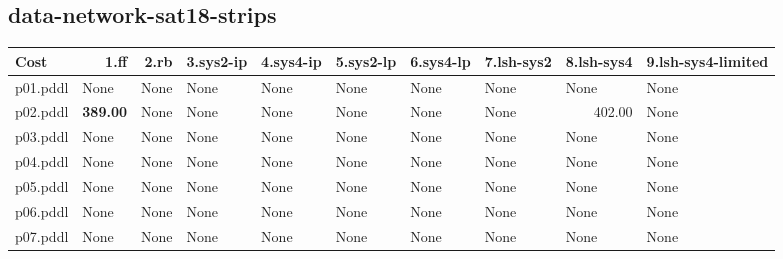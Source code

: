 \documentclass{article}
\begin{document}
\hypertarget{cost-data-network-sat18-strips}{}
\subsection*{data-network-sat18-strips}

\begin{tabular}{@{}lrrrrrrrrr@{}}
Cost & 1.ff & 2.rb & 3.sys2-ip & 4.sys4-ip & 5.sys2-lp & 6.sys4-lp & 7.lsh-sys2 & 8.lsh-sys4 & 9.lsh-sys4-limited \\
\midrule
p01.pddl & \multicolumn{1}{|l|}{None} & \multicolumn{1}{|l|}{None} & \multicolumn{1}{|l|}{None} & \multicolumn{1}{|l|}{None} & \multicolumn{1}{|l|}{None} & \multicolumn{1}{|l|}{None} & \multicolumn{1}{|l|}{None} & \multicolumn{1}{|l|}{None} & \multicolumn{1}{|l|}{None} \\
p02.pddl & \textbf{389.00} & \multicolumn{1}{|l|}{None} & \multicolumn{1}{|l|}{None} & \multicolumn{1}{|l|}{None} & \multicolumn{1}{|l|}{None} & \multicolumn{1}{|l|}{None} & \multicolumn{1}{|l|}{None} & 402.00 & \multicolumn{1}{|l|}{None} \\
p03.pddl & \multicolumn{1}{|l|}{None} & \multicolumn{1}{|l|}{None} & \multicolumn{1}{|l|}{None} & \multicolumn{1}{|l|}{None} & \multicolumn{1}{|l|}{None} & \multicolumn{1}{|l|}{None} & \multicolumn{1}{|l|}{None} & \multicolumn{1}{|l|}{None} & \multicolumn{1}{|l|}{None} \\
p04.pddl & \multicolumn{1}{|l|}{None} & \multicolumn{1}{|l|}{None} & \multicolumn{1}{|l|}{None} & \multicolumn{1}{|l|}{None} & \multicolumn{1}{|l|}{None} & \multicolumn{1}{|l|}{None} & \multicolumn{1}{|l|}{None} & \multicolumn{1}{|l|}{None} & \multicolumn{1}{|l|}{None} \\
p05.pddl & \multicolumn{1}{|l|}{None} & \multicolumn{1}{|l|}{None} & \multicolumn{1}{|l|}{None} & \multicolumn{1}{|l|}{None} & \multicolumn{1}{|l|}{None} & \multicolumn{1}{|l|}{None} & \multicolumn{1}{|l|}{None} & \multicolumn{1}{|l|}{None} & \multicolumn{1}{|l|}{None} \\
p06.pddl & \multicolumn{1}{|l|}{None} & \multicolumn{1}{|l|}{None} & \multicolumn{1}{|l|}{None} & \multicolumn{1}{|l|}{None} & \multicolumn{1}{|l|}{None} & \multicolumn{1}{|l|}{None} & \multicolumn{1}{|l|}{None} & \multicolumn{1}{|l|}{None} & \multicolumn{1}{|l|}{None} \\
p07.pddl & \multicolumn{1}{|l|}{None} & \multicolumn{1}{|l|}{None} & \multicolumn{1}{|l|}{None} & \multicolumn{1}{|l|}{None} & \multicolumn{1}{|l|}{None} & \multicolumn{1}{|l|}{None} & \multicolumn{1}{|l|}{None} & \multicolumn{1}{|l|}{None} & \multicolumn{1}{|l|}{None} \\

\end{tabular}
\end{document}
